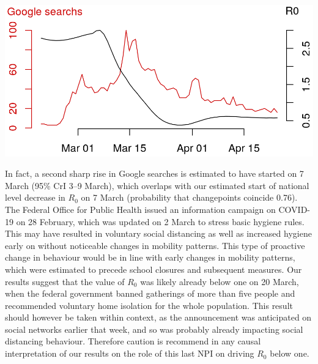 \begin{marginfigure}[1\baselineskip]
\includegraphics{fig_covid-switzerland-npi/fig_supp/google_trends.png}
\end{marginfigure}
 In fact, a second sharp rise in Google searches is estimated to have started on 7 March (95\% CrI 3–9 March), which overlaps with our estimated start of national level decrease in $R_0$ on 7 March (probability that changepoints coincide 0.76). The Federal Office for Public Health issued an information campaign on COVID-19 on 28 February, which was updated on 2 March to stress basic hygiene rules\cite{OFSP:NouvellesReglesHygiene:2020}. This may have resulted in voluntary social distancing as well as increased hygiene early on without noticeable changes in mobility patterns. This type of proactive change in behaviour would be in line with early changes in mobility patterns, which were estimated to precede school closures and subsequent measures. Our results suggest that the value of $R_0$ was likely already below one on 20 March, when the federal government banned gatherings of more than five people and recommended voluntary home isolation for the whole population. This result should however be taken within context, as the announcement was anticipated on social networks earlier that week, and so was probably already impacting social distancing behaviour. 
Therefore caution is recommend in any causal interpretation of our results on the role of this last NPI on driving $R_0$ below one.
